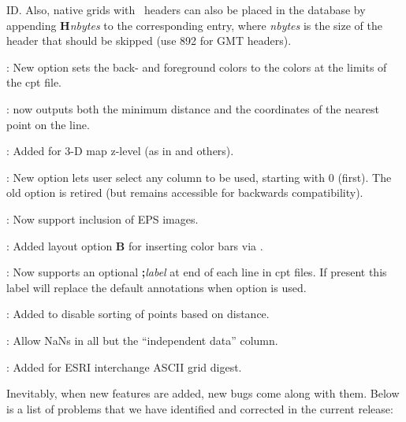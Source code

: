 \begin{description}
ID.  Also, native grids with \GMT\ headers can also be placed in the database by appending {\bf H}{\it nbytes} to the
corresponding  entry, where {\it nbytes} is the size of the header that should be skipped
(use 892 for GMT headers).
\item [\GMTprog{makecpt.c}]: New option  sets the back- and foreground colors to the colors at the limits of the cpt file.
\item [\GMTprog{mapproject.c}]:  now outputs both the minimum distance and the coordinates
of the nearest point on the line.
\item [\GMTprog{pscoast.c}]: Added  for 3-D map z-level (as in  and others).
\item [\GMTprog{pshistogram.c}]: New option  lets user select any column to be used, starting
with 0 (first).  The old  option is retired (but remains accessible for backwards compatibility).  
\item [\GMTprog{psimage.c}]: Now support inclusion of EPS images.
\item [\GMTprog{pslegend.c}]: Added layout option {\bf B} for inserting color bars via .
\item [\GMTprog{psscale.c}]: Now supports an optional {\bf ;}{\it label} at end of each line in cpt files.
If present this label will replace the default annotations when option  is used.
\item [\GMTprog{psxyz.c}]: Added  to disable sorting of points based on distance.
\item [\GMTprog{sample1d.c}]: Allow NaNs in all but the ``independent data'' column.
\item [\GMTprog{xyz2grd.c}]: Added  for ESRI interchange ASCII grid digest.
\end{description}

Inevitably, when new features are added, new bugs come along with them.  Below is a list of problems
that we have identified and corrected in the current release:

